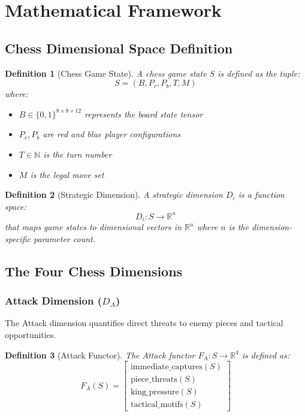 \documentclass[12pt,a4paper]{article}
\newtheorem{definition}{Definition}
\begin{document}
\section{Mathematical Framework}

\subsection{Chess Dimensional Space Definition}

\begin{definition}[Chess Game State]
A chess game state $S$ is defined as the tuple:
$$S = (B, P_r, P_b, T, M)$$
where:
\begin{itemize}
\item $B \in \{0,1\}^{8 \times 8 \times 12}$ represents the board state tensor
\item $P_r, P_b$ are red and blue player configurations
\item $T \in \mathbb{N}$ is the turn number
\item $M$ is the legal move set
\end{itemize}
\end{definition}

\begin{definition}[Strategic Dimension]
A strategic dimension $D_i$ is a function space:
$$D_i: S \rightarrow \mathbb{R}^n$$
that maps game states to dimensional vectors in $\mathbb{R}^n$ where $n$ is the dimension-specific parameter count.
\end{definition}

\subsection{The Four Chess Dimensions}

\subsubsection{Attack Dimension (\texorpdfstring{$D_A$}{DA})}

The Attack dimension quantifies direct threats to enemy pieces and tactical opportunities.

\begin{definition}[Attack Functor]
The Attack functor $F_A: S \rightarrow \mathbb{R}^4$ is defined as:
$$F_A(S) = \begin{bmatrix}
\text{immediate\_captures}(S) \\
\text{piece\_threats}(S) \\
\text{king\_pressure}(S) \\
\text{tactical\_motifs}(S)
\end{bmatrix}$$
\end{definition}
\end{document}
